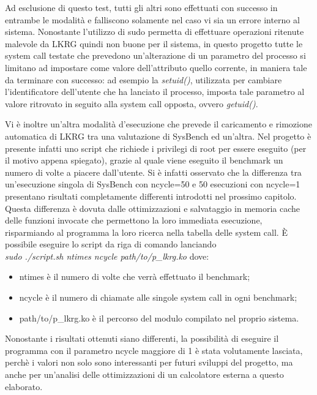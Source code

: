 Ad esclusione di questo test, tutti gli altri sono effettuati con successo in entrambe le modalità e falliscono solamente nel caso vi sia un errore interno al sistema. Nonostante l'utilizzo di sudo permetta di effettuare operazioni ritenute malevole da LKRG quindi non buone per il sistema, in questo progetto tutte le system call testate che prevedono un'alterazione di un parametro del processo si limitano ad impostare come valore dell'attributo quello corrente, in maniera tale da terminare con successo: ad esempio la \emph{setuid()}, utilizzata per cambiare l'identificatore dell'utente che ha lanciato il processo, imposta tale parametro al valore ritrovato in seguito alla system call opposta, ovvero \emph{getuid()}.

Vi è inoltre un'altra modalità d'esecuzione che prevede il caricamento e rimozione automatica di LKRG tra una valutazione di SysBench ed un'altra. Nel progetto è presente infatti uno script che richiede i privilegi di root per essere eseguito (per il motivo appena spiegato), grazie al quale viene eseguito il benchmark un numero di volte a piacere dall'utente. Si è infatti osservato che la differenza tra un'esecuzione singola di SysBench con ncycle=50 e 50 esecuzioni con ncycle=1 presentano risultati completamente differenti introdotti nel prossimo capitolo. Questa differenza è dovuta dalle ottimizzazioni e salvataggio in memoria cache delle funzioni invocate che permettono la loro immediata esecuzione, risparmiando al programma la loro ricerca nella tabella delle system call. È possibile eseguire lo script da riga di comando lanciando \\\emph{sudo ./script.sh ntimes ncycle path/to/p\_lkrg.ko} dove:

\begin{itemize}
\item ntimes è il numero di volte che verrà effettuato il benchmark;
\item ncycle è il numero di chiamate alle singole system call in ogni benchmark;
\item path/to/p\_lkrg.ko è il percorso del modulo compilato nel proprio sistema.
\end{itemize}

Nonostante i risultati ottenuti siano differenti, la possibilità di eseguire il programma con il parametro ncycle maggiore di 1 è stata volutamente lasciata, perchè i valori non solo sono interessanti per futuri sviluppi del progetto, ma anche per un'analisi delle ottimizzazioni di un calcolatore esterna a questo elaborato.